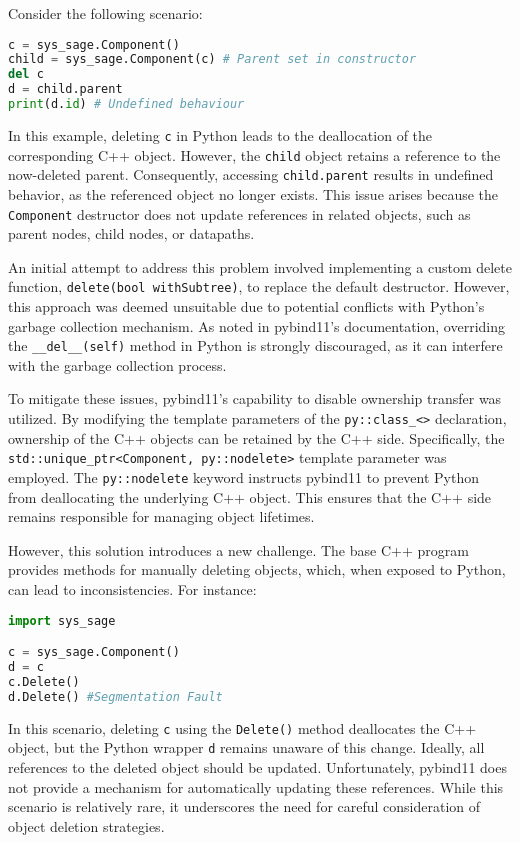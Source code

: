 Consider the following scenario:

  \begin{lstlisting}[language=Python, xleftmargin=4em]
c = sys_sage.Component()
child = sys_sage.Component(c) # Parent set in constructor
del c
d = child.parent
print(d.id) # Undefined behaviour
  \end{lstlisting}

In this example, deleting \verb|c| in Python leads to the deallocation of the corresponding C++ object. However, the \verb|child| object retains a reference to the now-deleted parent. Consequently, accessing \verb|child.parent| results in undefined behavior, as the referenced object no longer exists. This issue arises because the \verb|Component| destructor does not update references in related objects, such as parent nodes, child nodes, or datapaths.

An initial attempt to address this problem involved implementing a custom delete function, \verb|delete(bool withSubtree)|, to replace the default destructor. However, this approach was deemed unsuitable due to potential conflicts with Python's garbage collection mechanism. As noted in pybind11's documentation, overriding the \verb|__del__(self)| method in Python is strongly discouraged, as it can interfere with the garbage collection process.

To mitigate these issues, pybind11's capability to disable ownership transfer was utilized. By modifying the template parameters of the \verb|py::class_<>| declaration, ownership of the C++ objects can be retained by the C++ side. Specifically, the \verb|std::unique_ptr<Component, py::nodelete>| template parameter was employed. The \verb|py::nodelete| keyword instructs pybind11 to prevent Python from deallocating the underlying C++ object. This ensures that the C++ side remains responsible for managing object lifetimes.

However, this solution introduces a new challenge. The base C++ program provides methods for manually deleting objects, which, when exposed to Python, can lead to inconsistencies. For instance:
\newpage
  \begin{lstlisting}[language=Python, xleftmargin=4em]
import sys_sage

c = sys_sage.Component()
d = c
c.Delete()
d.Delete() #Segmentation Fault
  \end{lstlisting}
  

In this scenario, deleting \verb|c| using the \verb|Delete()| method deallocates the C++ object, but the Python wrapper \verb|d| remains unaware of this change. Ideally, all references to the deleted object should be updated. Unfortunately, pybind11 does not provide a mechanism for automatically updating these references. While this scenario is relatively rare, it underscores the need for careful consideration of object deletion strategies.

